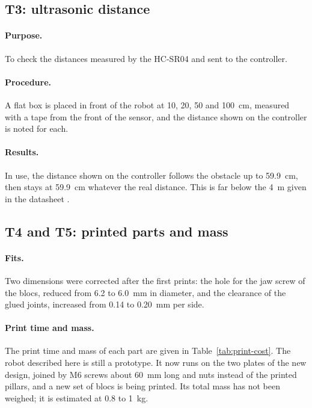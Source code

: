 \subsection{T3: ultrasonic distance}
\paragraph{Purpose.} To check the distances measured by the HC-SR04 and sent to the
controller.
\paragraph{Procedure.} A flat box is placed in front of the robot at 10, 20, 50 and 100~cm,
measured with a tape from the front of the sensor, and the distance shown on the
controller is noted for each.
\paragraph{Results.} In use, the distance shown on the controller follows the obstacle
up to 59.9~cm, then stays at 59.9~cm whatever the real distance. This is far below the
4~m given in the datasheet \cite{hcsr04_datasheet}. 

\subsection{T4 and T5: printed parts and mass}
\paragraph{Fits.} Two dimensions were corrected after the first prints: the hole for the
jaw screw of the blocs, reduced from 6.2 to 6.0~mm in diameter, and the clearance of the
glued joints, increased from 0.14 to 0.20~mm per side. 
\paragraph{Print time and mass.} The print time and mass of each part are given in
Table~\ref{tab:print-cost}. The robot described here is still a prototype. It now
runs on the two plates of the new design, joined by M6 screws about 60~mm long and nuts instead of the
printed pillars, and a new set of blocs is being printed.  Its total
mass has not been weighed; it is estimated at 0.8 to 1~kg. 

